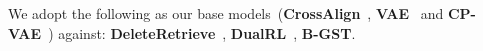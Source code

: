 
%

We adopt the following as our base models~(\textbf{CrossAlign}~\citep{shen2017style},  \textbf{VAE}~\citep{john2018disentangled} and \textbf{CP-VAE}~\citep{DBLP:journals/corr/abs-1905-11975}) against: \textbf{DeleteRetrieve}~\citep{li2018delete}, \textbf{DualRL}~\citep{luo2019dual}, \textbf{B-GST}\citep{Sudhakar2020}.


